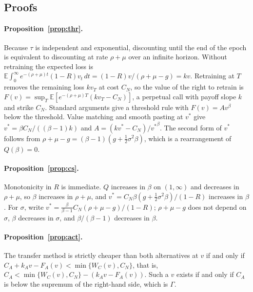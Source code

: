 \documentclass[ijds,nonblindrev]{informs4}
\newcommand{\E}{\mathbb{E}}
\begin{document}
\begin{APPENDICES}

\section{Proofs}\label{app:proofs}

\paragraph{Proposition~\ref{prop:thr}.} Because $\tau$ is independent and exponential, discounting until the end of the epoch is equivalent to discounting at rate $\rho+\mu$ over an infinite horizon. Without retraining the expected loss is $\E\int_0^\infty e^{-(\rho+\mu)t}(1-R)v_t\,dt=(1-R)v/(\rho+\mu-g)=kv$. Retraining at $T$ removes the remaining loss $kv_T$ at cost $C_N$, so the value of the right to retrain is $F(v)=\sup_T\E[e^{-(\rho+\mu)T}(kv_T-C_N)]$, a perpetual call with payoff slope $k$ and strike $C_N$. Standard arguments \citep{dixit1994investment} give a threshold rule with $F(v)=Av^\beta$ below the threshold. Value matching and smooth pasting at $v^*$ give $v^*=\beta C_N/((\beta-1)k)$ and $A=(kv^*-C_N)/{v^*}^\beta$. The second form of $v^*$ follows from $\rho+\mu-g=(\beta-1)(g+\tfrac12\sigma^2\beta)$, which is a rearrangement of $Q(\beta)=0$.

\paragraph{Proposition~\ref{prop:cs}.} Monotonicity in $R$ is immediate. $Q$ increases in $\beta$ on $(1,\infty)$ and decreases in $\rho+\mu$, so $\beta$ increases in $\rho+\mu$, and $v^*=C_N\beta(g+\tfrac12\sigma^2\beta)/(1-R)$ increases in $\beta$. For $\sigma$, write $v^*=\frac{\beta}{\beta-1}C_N(\rho+\mu-g)/(1-R)$; $\rho+\mu-g$ does not depend on $\sigma$, $\beta$ decreases in $\sigma$, and $\beta/(\beta-1)$ decreases in $\beta$.

\paragraph{Proposition~\ref{prop:act}.} The transfer method is strictly cheaper than both alternatives at $v$ if and only if $C_A+k_Av-F_A(v)<\min\{W_C(v),C_N\}$, that is, $C_A<\min\{W_C(v),C_N\}-(k_Av-F_A(v))$. Such a $v$ exists if and only if $C_A$ is below the supremum of the right-hand side, which is $\Gamma$.


\end{APPENDICES}
\end{document}
